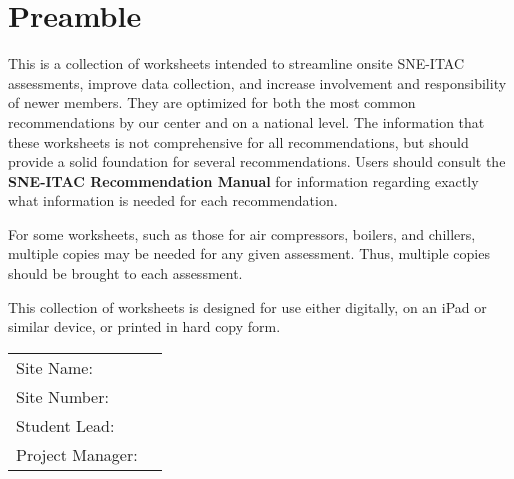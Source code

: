 \maketitle

\section*{Preamble}

This is a collection of worksheets intended to streamline onsite SNE-ITAC assessments, improve data collection, and increase involvement and responsibility of newer members. They are optimized for both the most common recommendations by our center and on a national level. The information that these worksheets is not comprehensive for all recommendations, but should provide a solid foundation for several recommendations. Users should consult the \textbf{SNE-ITAC Recommendation Manual} for information regarding exactly what information is needed for each recommendation. 

For some worksheets, such as those for air compressors, boilers, and chillers, multiple copies may be needed for any given assessment. Thus, multiple copies should be brought to each assessment. 

This collection of worksheets is designed for use either digitally, on an iPad or similar device, or printed in hard copy form. 

\vspace{1cm}

\noindent\begin{tabularx}{\textwidth}{@{}lX@{}}
Site Name: & \hrulefill \\[2ex]
Site Number: & \hrulefill \\[2ex]
Student Lead: & \hrulefill \\[2ex]
Project Manager: & \hrulefill \\[2ex]
\end{tabularx}